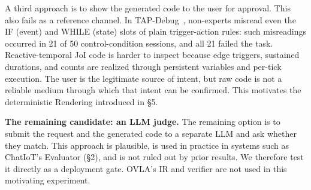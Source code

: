 \documentclass[sigconf,nonacm,anonymous,review]{acmart}
\begin{document}
A third approach is to show the generated code to the user for approval. This also fails as a reference channel. In TAP-Debug~\cite{tapdebug}, non-experts misread even the IF (event) and WHILE (state) slots of plain trigger-action rules: such misreadings occurred in 21 of 50 control-condition sessions, and all 21 failed the task. Reactive-temporal JoI code is harder to inspect because edge triggers, sustained durations, and counts are realized through persistent variables and per-tick execution. The user is the legitimate source of intent, but raw code is not a reliable medium through which that intent can be confirmed. This motivates the deterministic Rendering introduced in \S5.

\textbf{The remaining candidate: an LLM judge.}
The remaining option is to submit the request and the generated code to a separate LLM and ask whether they match. This approach is plausible, is used in practice in systems such as ChatIoT's Evaluator (\S2), and is not ruled out by prior results. We therefore test it directly as a deployment gate. OVLA's IR and verifier are not used in this motivating experiment.
\end{document}
